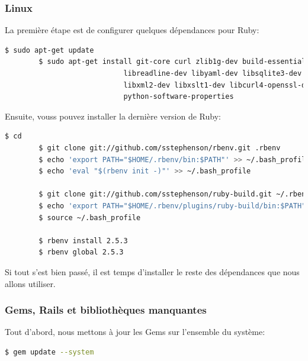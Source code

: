 \documentclass[]{report}
\begin{document}
      \subsubsection{Linux}

        La première étape est de configurer quelques dépendances pour Ruby:

        \begin{scriptsize}
        \begin{lstlisting}[language=bash]
        $ sudo apt-get update
        $ sudo apt-get install git-core curl zlib1g-dev build-essential libssl-dev \
                            libreadline-dev libyaml-dev libsqlite3-dev sqlite3 \
                            libxml2-dev libxslt1-dev libcurl4-openssl-dev zlib1g-dev \
                            python-software-properties
        \end{lstlisting}
        \end{scriptsize}

        Ensuite, vouss pouvez installer la dernière version de Ruby:

        \begin{scriptsize}
        \begin{lstlisting}[language=bash]
        $ cd
        $ git clone git://github.com/sstephenson/rbenv.git .rbenv
        $ echo 'export PATH="$HOME/.rbenv/bin:$PATH"' >> ~/.bash_profile
        $ echo 'eval "$(rbenv init -)"' >> ~/.bash_profile

        $ git clone git://github.com/sstephenson/ruby-build.git ~/.rbenv/plugins/ruby-build
        $ echo 'export PATH="$HOME/.rbenv/plugins/ruby-build/bin:$PATH"' >> ~/.bash_profile
        $ source ~/.bash_profile

        $ rbenv install 2.5.3
        $ rbenv global 2.5.3
        \end{lstlisting}
        \end{scriptsize}

        Si tout s'est bien passé, il est temps d'installer le reste des dépendances que nous allons utiliser.

      \subsubsection{Gems, Rails et bibliothèques manquantes}

        Tout d'abord, nous mettons à jour les Gems sur l'ensemble du système:

        \begin{scriptsize}
        \begin{lstlisting}[language=bash]
        $ gem update --system
        \end{lstlisting}
        \end{scriptsize}
\end{document}
